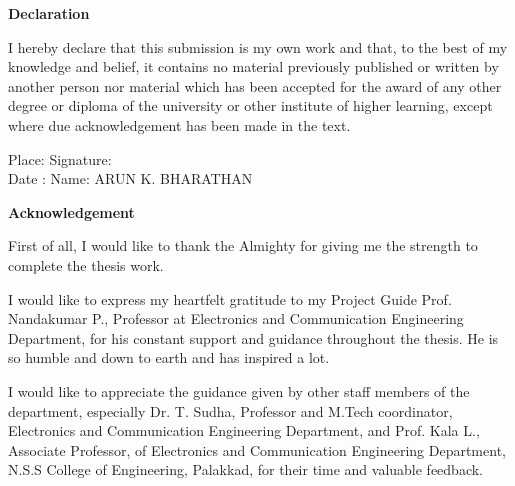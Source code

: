 \cleardoublepage

\begin{center}{\large{\bf {Declaration}}}
\end{center}

I hereby declare that this submission is my own work and that, to the best of my knowledge and belief, it contains no material previously published or written by another person nor material which has been accepted for the award of any other degree or diploma of the university or other institute of higher learning, except where due acknowledgement has been made in the text.\\
  \begin{center}
         \vspace{2cm}
    \end{center}
\begin{flushleft}
Place:  \hspace*{3 in} Signature: \\
Date :  \hspace*{3 in} Name: ARUN K. BHARATHAN
\end{flushleft}



\newpage \null \thispagestyle{empty} \newpage



\cleardoublepage

\begin{center}{\large{\bf {Acknowledgement}}}
\end{center}
\noindent
First of all, I would like to thank the Almighty for giving me the strength to complete the thesis work.

I would like to express my heartfelt gratitude to my Project Guide  Prof. Nandakumar P., Professor at Electronics and Communication Engineering Department, for his constant support and guidance throughout the thesis. He is so humble and down to earth and  has inspired a lot.

I would like to appreciate the guidance given by other staff members of the department, especially Dr. T. Sudha, Professor 
and M.Tech coordinator, Electronics and Communication Engineering Department, and Prof. Kala L.,  Associate Professor, of 
Electronics and Communication Engineering Department, N.S.S College of Engineering, Palakkad, for their time and valuable feedback.

